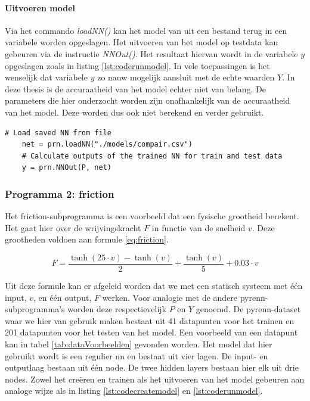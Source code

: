 			\newpage
			
			\paragraph{Uitvoeren model} 
			Via het commando \textit{loadNN()} kan het model van uit een bestand terug in een variabele worden opgeslagen. Het uitvoeren van het model op testdata kan gebeuren via de instructie \textit{NNOut()}. Het resultaat hiervan wordt in de variabele $y$ opgeslagen zoals in listing \ref{lst:coderunmodel}. In vele toepassingen is het wenselijk dat variabele $y$ zo nauw mogelijk aansluit met de echte waarden $Y$. In deze thesis is de accuraatheid van het model echter niet van belang. De parameters die hier onderzocht worden zijn onafhankelijk van de accuraatheid van het model. Deze worden dus ook niet berekend en verder gebruikt. 
	\begin{lstlisting}[caption={uitvoeren van pyrenn-model.},captionpos=b, label = {lst:coderunmodel}]
	# Load saved NN from file
	net = prn.loadNN("./models/compair.csv")
	# Calculate outputs of the trained NN for train and test data	
	y = prn.NNOut(P, net)
	\end{lstlisting}
		
		\subsubsection{Programma 2: friction}
		Het friction-subprogramma is een voorbeeld dat een fysische grootheid berekent. Het gaat hier over de wrijvingskracht $F$ in functie van de snelheid $v$. Deze grootheden voldoen aan formule \ref{eq:friction}. 
	
		\begin{equation}\label{eq:friction}
					F = \frac{\tanh(25 \cdot v)- \tanh(v)}{2} + \frac{\tanh(v)}{5}+0.03\cdot v			
		\end{equation}
	
		Uit deze formule kan er afgeleid worden dat we met een statisch systeem met \'e\'en input, $v$, en \'e\'en output, $F$ werken. Voor analogie met de andere pyrenn-subprogramma's worden deze respectievelijk $P$ en $Y$ genoemd. De pyrenn-dataset waar we hier van gebruik maken bestaat uit 41 datapunten voor het trainen en 201 datapunten voor het testen van het model. Een voorbeeld van een datapunt kan in tabel \ref{tab:dataVoorbeelden} gevonden worden. Het model dat hier gebruikt wordt is een regulier \gls{nn} en bestaat uit vier lagen. De input- en outputlaag bestaan uit \'e\'en node. De twee hidden layers bestaan hier elk uit drie nodes. Zowel het cre\"eren en trainen als het uitvoeren van het model gebeuren aan analoge wijze als in listing \ref{lst:codecreatemodel} en \ref{lst:coderunmodel}.
						
